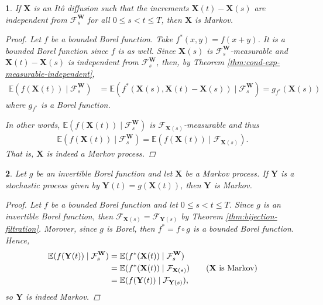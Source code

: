 \documentclass[english]{article}
\numberwithin{equation}{section}
\numberwithin{figure}{section}
\theoremstyle{bolddescit}
\newtheorem{theorem}{\protect\theoremname}[section]
\theoremstyle{definition}
\theoremstyle{definition}
\theoremstyle{plain}
\theoremstyle{plain}
\theoremstyle{bolddesc}
\theoremstyle{plain}
\theoremstyle{remark}
\providecommand{\theoremname}{Theorem}
\begin{document}
\begin{theorem}\label{thm:fp-ito-diffusion-markov}
  If $\mathbf{X}$ is an It\^o diffusion such that the increments $\mathbf{X}(t) - \mathbf{X}(s)$ are independent from $\mathcal{F}^\mathbf{W}_s$ for all $0 \le s < t \le T$, then $\mathbf{X}$ is Markov.

  \begin{proof}
    Let $f$ be a bounded Borel function. Take $f^*(x,y) = f(x+y)$. It is a bounded Borel function since $f$ is as well. Since $\mathbf{X}(s)$ is $\mathcal{F}^\mathbf{W}_s$-measurable and $\mathbf{X}(t) - \mathbf{X}(s)$ is independent from $\mathcal{F}^\mathbf{W}_s$, then, by Theorem \ref{thm:cond-exp-measurable-independent},
    \begin{align*}
      \mathbb{E}(f(\mathbf{X}(t)) \mid \mathcal{F}^\mathbf{W}_s)
      &= \mathbb{E}(f^*(\mathbf{X}(s), \mathbf{X}(t) - \mathbf{X}(s)) \mid \mathcal{F}^\mathbf{W}_s)
      = g_{f^*}(\mathbf{X}(s))
    \end{align*}
    where $g_{f^*}$ is a Borel function.

    In other words, $\mathbb{E}(f(\mathbf{X}(t)) \mid \mathcal{F}^\mathbf{W}_s)$ is $\mathcal{F}_{\mathbf{X}(s)}$-measurable and thus
    \begin{align*}
      \mathbb{E}(f(\mathbf{X}(t)) \mid \mathcal{F}^\mathbf{W}_{s})
      = \mathbb{E}(f(\mathbf{X}(t)) \mid \mathcal{F}_{\mathbf{X}(s)}).
    \end{align*}
    That is, $\mathbf{X}$ is indeed a Markov process.
  \end{proof}
\end{theorem}

\begin{theorem}\label{thm:fp-markov-composing}
  Let $g$ be an invertible Borel function and let $\mathbf{X}$ be a Markov process. If $\mathbf{Y}$ is a stochastic process given by $\mathbf{Y}(t) = g(\mathbf{X}(t))$, then $\mathbf{Y}$ is Markov.

  \begin{proof}
    Let $f$ be a bounded Borel function and let $0 \le s < t \le T$. Since $g$ is an invertible Borel function, then $\mathcal{F}_{\mathbf{X}(s)} = \mathcal{F}_{\mathbf{Y}(s)}$ by Theorem \ref{thm:bijection-filtration}. Morover, since $g$ is Borel, then $f^* = f \circ g$ is a bounded Borel function. Hence,
    \begin{align*}
      \mathbb{E}(f(\mathbf{Y}(t)) \mid \mathcal{F}^\mathbf{W}_s)
      &= \mathbb{E}(f^*(\mathbf{X}(t)) \mid \mathcal{F}^\mathbf{W}_s)\\
      &= \mathbb{E}(f^*(\mathbf{X}(t)) \mid \mathcal{F}_{\mathbf{X}(s)}) \tag{$\mathbf{X}$ is Markov}\\
      &= \mathbb{E}(f(\mathbf{Y}(t)) \mid \mathcal{F}_{\mathbf{Y}(s)}),
    \end{align*}
    so $\mathbf{Y}$ is indeed Markov.
  \end{proof}
\end{theorem}
\end{document}
